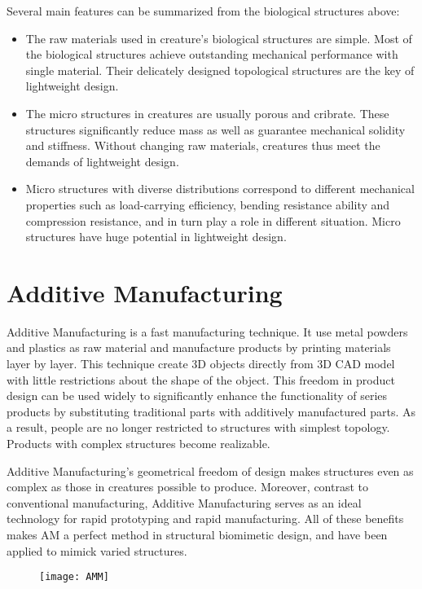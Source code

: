Several main features can be summarized from the biological structures above:
\begin{itemize}
\item The raw materials used in creature's biological structures are simple. Most of the biological structures achieve outstanding mechanical performance with single material. Their delicately designed topological structures are the key of lightweight design.

\item The micro structures in creatures are usually porous and cribrate. These structures significantly reduce mass as well as guarantee mechanical solidity and stiffness. Without changing raw materials, creatures thus meet the demands of lightweight design.

\item Micro structures with diverse distributions correspond to different mechanical properties such as load-carrying efficiency, bending resistance ability and compression resistance, and in turn play a role in different situation. Micro structures have huge potential in lightweight design.
\end{itemize}

\section{Additive Manufacturing}

Additive Manufacturing is a fast manufacturing technique. It use metal powders and plastics as raw material and manufacture products by printing materials layer by layer. This technique create 3D objects directly from 3D CAD model with little restrictions about the shape of the object. This freedom in product design can be used widely to significantly enhance the functionality of series products by substituting traditional parts with additively manufactured parts. As a result, people are no longer restricted to structures with simplest topology. Products with complex structures become realizable. 

Additive Manufacturing's geometrical freedom of design makes structures even as complex as those in creatures possible to produce. Moreover, contrast to conventional manufacturing, Additive Manufacturing serves as an ideal technology for rapid prototyping and rapid manufacturing. All of these benefits makes AM a perfect method in structural biomimetic design, and have been applied to mimick varied structures.

\begin{figure}
	\centering
	\texttt{[image: AMM]}
	\label{fig:4}
\end{figure}

